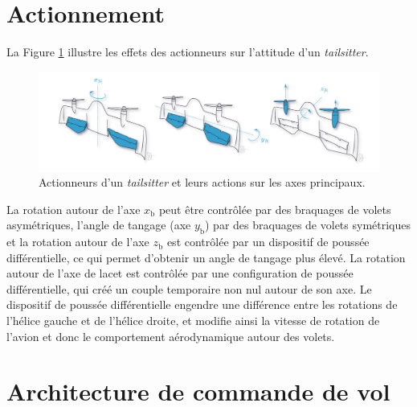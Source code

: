 \section{Actionnement}

La Figure \ref{fig:actionDarko} illustre les effets des actionneurs sur l'attitude d'un \textit{tailsitter}.
\begin{figure}[ht!]
    \centerline{
    \includegraphics[trim=0cm 0cm 0cm 0cm,clip,width=1\columnwidth]{figures/actionnement.png}}
    \caption{Actionneurs d'un \textit{tailsitter} et leurs actions sur les axes principaux.}
    \label{fig:actionDarko}
\end{figure}

La rotation autour de l'axe $x_{\text{b}}$ peut être contrôlée par des braquages de volets asymétriques, l'angle de tangage (axe $y_{\text{b}}$) par des braquages de volets symétriques et la rotation autour de l'axe $z_{\text{b}}$ est contrôlée par un dispositif de poussée différentielle, ce qui permet d'obtenir un angle de tangage plus élevé. La rotation autour de l'axe de lacet est contrôlée par une configuration de poussée différentielle, qui créé un couple temporaire non nul autour de son axe. Le dispositif de poussée différentielle engendre une différence entre les rotations de l'hélice gauche et de l'hélice droite, et modifie ainsi la vitesse de rotation de l'avion et donc le comportement aérodynamique autour des volets.


\section{Architecture de commande de vol}


